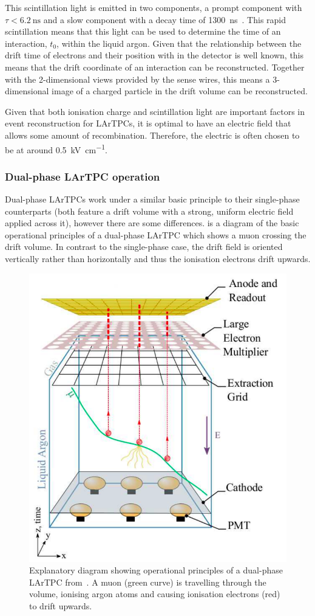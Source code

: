 This scintillation light is emitted in two components, a prompt component with $\tau < \SI{6.2}{\nano\second}$ and a slow component with a decay time of \SI{1300}{\nano\second}~\cite{argonScintillation}.
This rapid scintillation means that this light can be used to determine the time of an interaction, $t_0$, within the liquid argon.
Given that the relationship between the drift time of electrons and their position with in the detector is well known, this means that the drift coordinate of an interaction can be reconstructed.
Together with the 2-dimensional views provided by the sense wires, this means a 3-dimensional image of a charged particle in the drift volume can be reconstructed.

Given that both ionisation charge and scintillation light are important factors in event reconstruction for LArTPCs, it is optimal to have an electric field that allows some amount of recombination.
Therefore, the electric is often chosen to be at around 0.5~\si{\kilo\volt\per\centi\metre}.

\subsubsection{Dual-phase LArTPC operation}
\label{sec:dune:fd:lartpc:dualphase}

Dual-phase LArTPCs work under a similar basic principle to their single-phase counterparts (both feature a drift volume with a strong, uniform electric field applied across it), however there are some differences.
 is a diagram of the basic operational principles of a dual-phase LArTPC which shows a muon crossing the drift volume.
In contrast to the single-phase case, the drift field is oriented vertically rather than horizontally and thus the ionisation electrons drift upwards.

\begin{figure}
  \centering
  \includegraphics[width=.6\linewidth]{files/figures/dune_detector/dualPhase}
  \caption[Explanatory diagram showing operational principles of a dual-phase LArTPC.]{Explanatory diagram showing operational principles of a dual-phase LArTPC from~\cite{tdrVol1}. A muon (green curve) is travelling through the volume, ionising argon atoms and causing ionisation electrons (red) to drift upwards.}
  \label{fig:dualPhase}
\end{figure}

